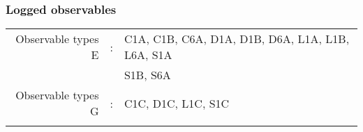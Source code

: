 %
\subsubsection{Logged observables}%
\label{ssubsec:Loggedobservables}%
\setlength{\tabcolsep}{4pt}%
\begin{longtabu}[l]{rcl}%
Observable types E&:&C1A, C1B, C6A, D1A, D1B, D6A, L1A, L1B, L6A, S1A\\%
&&S1B, S6A\\%
Observable types G&:&C1C, D1C, L1C, S1C\\%
&&\\%
\end{longtabu}

